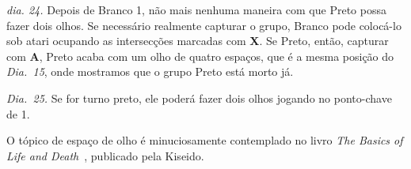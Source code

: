 \emph{dia. 24.} Depois de Branco 1, não mais nenhuma maneira com que Preto possa fazer dois olhos. Se necessário realmente capturar o grupo, Branco pode colocá-lo sob atari ocupando as intersecções marcadas com \textbf{X}. Se Preto, então, capturar com \textbf{A}, Preto acaba com um olho de quatro espaços, que é a mesma posição do \emph{Dia.\@~15}, onde mostramos que o grupo Preto está morto já.

\emph{Dia.\@~25.} Se for turno preto, ele poderá fazer dois olhos jogando no ponto-chave de 1.

O tópico de espaço de olho é minuciosamente contemplado no livro \emph{The Basics of Life and Death}~\cite{zeijst_bozulich_basics_of_life_and_death}, publicado pela Kiseido.